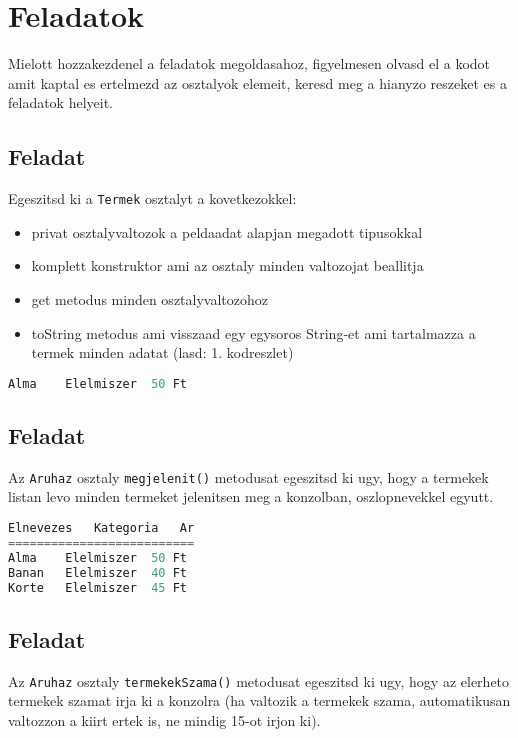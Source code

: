 \documentclass{article}
\begin{document}
\section{Feladatok}

Mielott hozzakezdenel a feladatok megoldasahoz, figyelmesen olvasd el a kodot amit kaptal es ertelmezd az osztalyok elemeit, keresd meg a hianyzo reszeket es a feladatok helyeit.

\subsection{Feladat}
Egeszitsd ki a \lstinline{Termek} osztalyt a kovetkezokkel:
\begin{itemize}
    \item privat osztalyvaltozok a peldaadat alapjan megadott tipusokkal
    \item komplett konstruktor ami az osztaly minden valtozojat beallitja
    \item get metodus minden osztalyvaltozohoz
    \item toString metodus ami visszaad egy egysoros String-et ami tartalmazza a termek minden adatat (lasd: 1. kodreszlet)
\end{itemize}

\begin{lstlisting}[language=Java, caption=Pelda Termek.toString() eredmeny]
Alma    Elelmiszer  50 Ft
\end{lstlisting}

\subsection{Feladat}
Az \lstinline{Aruhaz} osztaly \lstinline{megjelenit()} metodusat egeszitsd ki ugy, hogy a termekek listan levo minden termeket jelenitsen meg a konzolban, oszlopnevekkel egyutt.

\begin{lstlisting}[language=Java, caption=Pelda Aruhaz.megjelenit() kimenet]
Elnevezes   Kategoria   Ar
==========================
Alma    Elelmiszer  50 Ft
Banan   Elelmiszer  40 Ft
Korte   Elelmiszer  45 Ft
\end{lstlisting}

\subsection{Feladat}

Az \lstinline{Aruhaz} osztaly \lstinline{termekekSzama()} metodusat egeszitsd ki ugy, hogy az elerheto termekek szamat irja ki a konzolra (ha valtozik a termekek szama, automatikusan valtozzon a kiirt ertek is, ne mindig 15-ot irjon ki).
\end{document}
